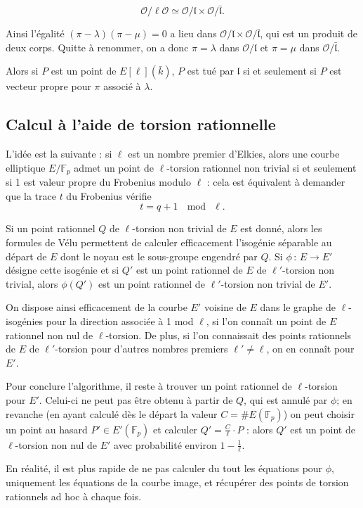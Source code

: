 \documentclass[11pt,a4paper]{article}
\newcommand{\F}{\mathbb{F}}
\renewcommand{\O}{\mathcal{O}}
\newcommand{\vers}{\rightarrow}
\renewcommand{\frak}{\mathfrak}
\newcommand{\de}{\,:\,}
\theoremstyle{definition}
\begin{document}
$$\O/\ell\O \simeq \O/\frak l \times \O/\bar{\frak l}.$$

Ainsi l'égalité $(\pi-\lambda)(\pi-\mu)=0$ a lieu dans $\O/\frak l \times \O/\bar{\frak l}$, qui est un produit de deux corps. Quitte à renommer, on a donc $\pi=\lambda$ dans $\O/\frak l$ et $\pi=\mu$ dans $\O/\bar{\frak l}$.

Alors si $P$ est un point de $E[\ell](\bar{k})$, $P$ est tué par $\frak l$ si et seulement si $P$ est vecteur propre pour $\pi$ associé à $\lambda$.



\subsection{Calcul à l'aide de torsion rationnelle}

L'idée est la suivante : si $\ell$ est un nombre premier d'Elkies, alors une courbe elliptique $E/\F_p$ admet un point de $\ell$-torsion rationnel non trivial si et seulement si 1 est valeur propre du Frobenius modulo $\ell$ : cela est équivalent à demander que la trace $t$ du Frobenius vérifie
$$t = q+1 \ \mod\ \ell.$$

Si un point rationnel $Q$ de $\ell$-torsion non trivial de $E$ est donné, alors les formules de Vélu permettent de calculer efficacement l'isogénie séparable au départ de $E$ dont le noyau est le sous-groupe engendré par $Q$. Si $\phi\de E\vers E'$ désigne cette isogénie et si $Q'$ est un point rationnel de $E$ de $\ell'$-torsion non trivial, alors $\phi(Q')$ est un point rationnel de $\ell'$-torsion non trivial de $E'$.

On dispose ainsi efficacement de la courbe $E'$ voisine de $E$ dans le graphe de $\ell$-isogénies pour la direction associée à 1 mod $\ell$, si l'on connaît un point de $E$ rationnel non nul de $\ell$-torsion. De plus, si l'on connaissait des points rationnels de $E$ de $\ell'$-torsion pour d'autres nombres premiers $\ell'\neq \ell$, on en connaît pour $E'$.

Pour conclure l'algorithme, il reste à trouver un point rationnel de $\ell$-torsion pour $E'$. Celui-ci ne peut pas être obtenu à partir de $Q$, qui est annulé par $\phi$; en revanche (en ayant calculé dès le départ la valeur $C=\#E(\F_p)$) on peut choisir un point au hasard $P'\in E'(\F_p)$ et calculer $Q'=\frac{C}{\ell}\cdot P$ : alors $Q'$ est un point de $\ell$-torsion non nul de $E'$ avec probabilité environ $1-\frac{1}{\ell}$.

En réalité, il est plus rapide de ne pas calculer du tout les équations pour $\phi$, uniquement les équations de la courbe image, et récupérer des points de torsion rationnels ad hoc à chaque fois.
\end{document}
